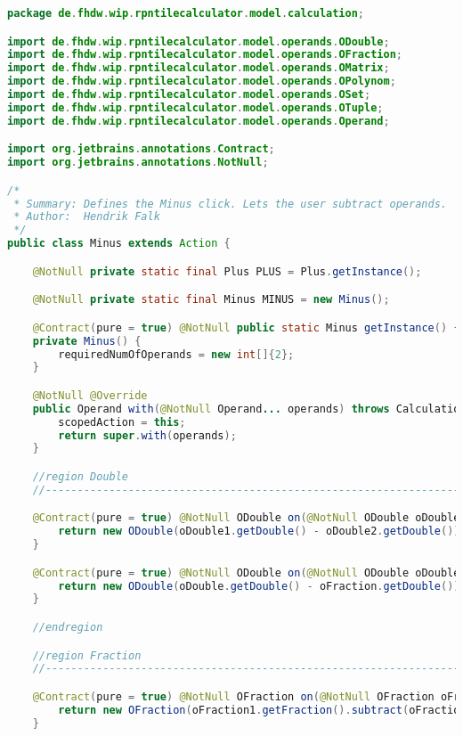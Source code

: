 \begin{lstlisting}[caption=Minus (Falk),label=list:Minus,language=Java]
package de.fhdw.wip.rpntilecalculator.model.calculation;

import de.fhdw.wip.rpntilecalculator.model.operands.ODouble;
import de.fhdw.wip.rpntilecalculator.model.operands.OFraction;
import de.fhdw.wip.rpntilecalculator.model.operands.OMatrix;
import de.fhdw.wip.rpntilecalculator.model.operands.OPolynom;
import de.fhdw.wip.rpntilecalculator.model.operands.OSet;
import de.fhdw.wip.rpntilecalculator.model.operands.OTuple;
import de.fhdw.wip.rpntilecalculator.model.operands.Operand;

import org.jetbrains.annotations.Contract;
import org.jetbrains.annotations.NotNull;

/*
 * Summary: Defines the Minus click. Lets the user subtract operands.
 * Author:  Hendrik Falk
 */
public class Minus extends Action {

    @NotNull private static final Plus PLUS = Plus.getInstance();

    @NotNull private static final Minus MINUS = new Minus();

    @Contract(pure = true) @NotNull public static Minus getInstance() { return MINUS; }
    private Minus() {
        requiredNumOfOperands = new int[]{2};
    }

    @NotNull @Override
    public Operand with(@NotNull Operand... operands) throws CalculationException {
        scopedAction = this;
        return super.with(operands);
    }

    //region Double
    //------------------------------------------------------------------------------------

    @Contract(pure = true) @NotNull ODouble on(@NotNull ODouble oDouble1, @NotNull ODouble oDouble2) {
        return new ODouble(oDouble1.getDouble() - oDouble2.getDouble());
    }

    @Contract(pure = true) @NotNull ODouble on(@NotNull ODouble oDouble, @NotNull OFraction oFraction) {
        return new ODouble(oDouble.getDouble() - oFraction.getDouble());
    }

    //endregion

    //region Fraction
    //------------------------------------------------------------------------------------

    @Contract(pure = true) @NotNull OFraction on(@NotNull OFraction oFraction1, @NotNull OFraction oFraction2) {
        return new OFraction(oFraction1.getFraction().subtract(oFraction2.getFraction()));
    }


\end{lstlisting}
